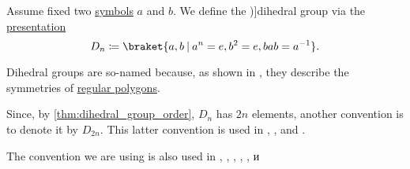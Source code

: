 \begin{definition}\label{def:dihedral_group}
  Assume fixed two \hyperref[def:formal_language/symbol]{symbols} \( a \) and \( b \). We define the \term[ru=группа диедра (\cite[161]{Винберг2014КурсАлгебры})]{dihedral group} via the \hyperref[def:group_presentation]{presentation}
  \begin{equation}\label{eq:def:dihedral_group}
    D_n \coloneqq \braket{ a, b \given a^n = e, b^2 = e, bab = a^{-1} }.
  \end{equation}
\end{definition}
\begin{comments}
  \item Dihedral groups are so-named because, as shown in , they describe the symmetries of \hyperref[def:regular_polygon]{regular polygons}.

  \item Since, by \cref{thm:dihedral_group_order}, \( D_n \) has \( 2n \) elements, another convention is to denote it by \( D_{2n} \). This latter convention is used in
  \cite[exerc. 1.1.34(a)]{Lang2002Algebra},
  \cite[2]{Berger1987GeometryI},
  \cite[52]{Aluffi2009Algebra} and
  \cite[136]{Rotman2015AdvancedModernAlgebraPart1}.

  The convention we are using is also used in
  \cite[34]{Jacobson1985BasicAlgebraI},
  \cite[148]{Bourbaki1998Algebra1to3},
  \cite[121]{Knapp2006BasicAlgebra},
  \cite[example 8.2.3]{Steinberg2012RepresentationTheory},
  \cite[230]{Aigner1997CombinatorialTheory},
  \cite[example 4.1.11]{Винберг2014КурсАлгебры} и
  \cite[149]{Шафаревич1999ОсновныеПонятияАлгебры}
\end{comments}

